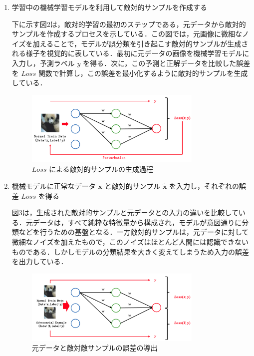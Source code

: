 \begin{enumerate}

    \item 学習中の機械学習モデルを利用して敵対的サンプルを作成する

    下に示す図2は，敵対的学習の最初のステップである，元データから敵対的サンプルを作成するプロセスを示している．この図では，元画像に微細なノイズを加えることで，モデルが誤分類を引き起こす敵対的サンプルが生成される様子を視覚的に表している．最初に元データの画像を機械学習モデルに入力し，予測ラベル $y$ を得る．次に，この予測と正解データを比較した誤差を $Loss$ 関数で計算し，この誤差を最小化するように敵対的サンプルを生成している．
    
    \begin{figure}[H]
        \centering
        \includegraphics[width=0.8\textwidth]{images/敵対的学習1.png}
        \caption{ $Loss$ による敵対的サンプルの生成過程}
        \label{fig:adversarial_learning1}
    \end{figure}
    
    \item 機械モデルに正常なデータ $\bm{x}$ と敵対的サンプル $\bm{\tilde{x}}$ を入力し，それぞれの誤差 $Loss$ を得る

    図3は，生成された敵対的サンプルと元データとの入力の違いを比較している．元データは，すべて純粋な特徴量から構成され，モデルが意図通りに分類などを行うための基盤となる．一方敵対的サンプルは，元データに対して微細なノイズを加えたもので，このノイズはほとんど人間には認識できないものである．しかしモデルの分類結果を大きく変えてしまうため入力の誤差を出力している．

    \begin{figure}[H]
        \centering
        \includegraphics[width=0.8\textwidth]{images/敵対的学習2.png}
        \caption{元データと敵対敵サンプルの誤差の導出}
        \label{fig:adversarial_learning2}
    \end{figure}


\end{enumerate}
